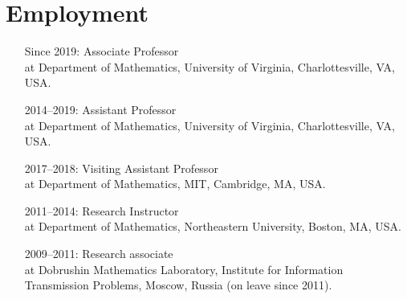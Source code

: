 \documentclass[letterpaper,11pt]{article}
\begin{document}
\section*{Employment}

\begin{itemize}
	\item
	      [Since 2019:]
	      Associate Professor\\ at Department of Mathematics, University
	      of Virginia, Charlottesville, VA, USA.
	\item
	      [2014--2019:]
	      Assistant Professor\\ at Department of Mathematics, University
	      of Virginia, Charlottesville, VA, USA.
	\item
	      [2017--2018:]
	      Visiting Assistant Professor\\ at Department of Mathematics, MIT, 
	      Cambridge, MA, USA.
	\item
	      [2011--2014:]
	      Research Instructor\\ at Department of Mathematics, Northeastern
	      University, Boston, MA, USA.
	\item
	      [2009--2011:]
	      Research associate\\ at Dobrushin Mathematics Laboratory,
	      Institute for Information Transmission Problems, Moscow, Russia (on leave
	      since 2011).
\end{itemize}
\end{document}
